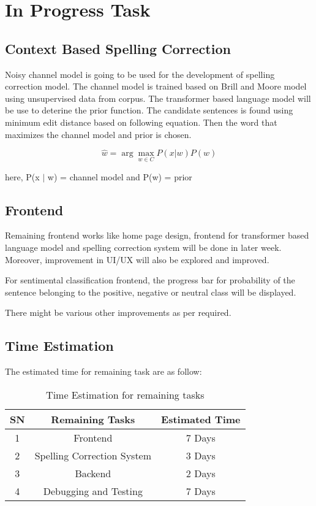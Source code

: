 \chapter{In Progress Task}
\section{Context Based Spelling Correction}
Noisy channel model is going to be used for the development of spelling correction model. The channel model is trained based on Brill and Moore model using unsupervised data from corpus. The transformer based language model will be use to deterine the prior function. The candidate sentences is found using minimum edit distance based on following equation. Then the word that maximizes the channel model and prior is chosen.

\begin{equation}
    \hat{w} = \arg \max_{w \in C} P(x | w) P (w)
\end{equation}

here, P(x $|$ w) = channel model and P(w) = prior

\section{Frontend}
Remaining frontend works like home page design, frontend for transformer based language model and spelling correction system will be done in later week. Moreover, improvement in UI/UX will also be explored and improved.

For sentimental classification frontend, the progress bar for probability of the sentence belonging to the positive, negative or neutral class will be displayed.

There might be various other improvements as per required.

\section{Time Estimation}
The estimated time for remaining task are as follow:

\begin{table}[H]
    \centering
    \begin{tabular}{|c| c| c|}
        \hline
        SN & Remaining Tasks & Estimated Time \\
        \hline
        1 & Frontend & 7 Days \\
        \hline
        2 & Spelling Correction System & 3 Days \\
        \hline
        3 & Backend & 2 Days \\
        \hline
        4 & Debugging and Testing & 7 Days \\
        \hline
    \end{tabular}
    \caption{Time Estimation for remaining tasks}
    \label{tab:Time Estimation for remaining tasks}
\end{table}